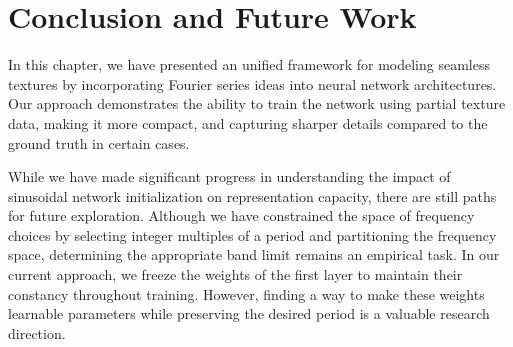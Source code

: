 










\section{Conclusion and Future Work}

In this chapter, we have presented an unified framework for modeling seamless textures by incorporating Fourier series ideas into neural network architectures. Our approach demonstrates the ability to train the network using partial texture data, making it more compact, and capturing sharper details compared to the ground truth in certain cases.

While we have made significant progress in understanding the impact of sinusoidal network initialization on representation capacity, there are still paths for future exploration. Although we have constrained the space of frequency choices by selecting integer multiples of a period and partitioning the frequency space, determining the appropriate band limit remains an empirical task. In our current approach, we freeze the weights of the first layer to maintain their constancy throughout training. However, finding a way to make these weights learnable parameters while preserving the desired period is a valuable research direction.


